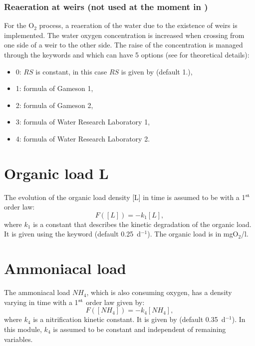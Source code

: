 \subsubsection{Reaeration at weirs (not used at the moment in \waqtel)}
For the O$_2$ process, a reaeration of the water due to the existence of weirs is implemented.
The water oxygen concentration is increased when crossing
from one side of a weir to the other side.
The raise of the concentration is managed through the keywords
 and 
which can have 5 options (see \cite{El-Kadi2012} for theoretical details):

\begin{itemize}
\item 0: $RS$ is constant, in this case $RS$ is given by
   (default 1.),
\item 1: formula of Gameson 1,
\item 2: formula of Gameson 2,
\item 3: formula of Water Research Laboratory 1,
\item 4: formula of Water Research Laboratory 2.
\end{itemize}


\section{Organic load L}

The evolution of the organic load density [L] in time is assumed
to be with a 1$^{\rm{st}}$ order law:
\begin{equation*}
 F([L]) = -k_1 [L],
\end{equation*}
where $k_1$ is a constant that describes the kinetic degradation of the organic load.
It is given using the keyword 
(default 0.25~d$^{-1}$).
The organic load is in mgO$_2$/l.


\section{Ammoniacal load}

The ammoniacal load $NH_4$, which is also consuming oxygen,
has a density varying in time with a 1$^{\rm{st}}$ order law given by:
\begin{equation*}
 F([NH_4]) = -k_4 [NH_4],
\end{equation*}
where $k_4$ is a nitrification kinetic constant.
It is given by  (default 0.35~d$^{-1}$).
In this module, $k_4$ is assumed to be constant and independent of remaining variables.



